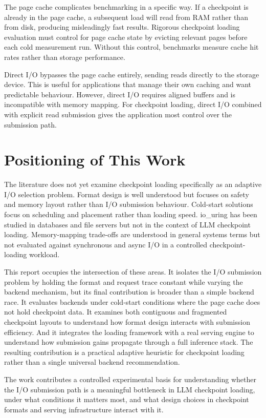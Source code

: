 The page cache complicates benchmarking in a specific way. If a checkpoint is already in the page cache, a subsequent load will read from RAM rather than from disk, producing misleadingly fast results. Rigorous checkpoint loading evaluation must control for page cache state by evicting relevant pages before each cold measurement run. Without this control, benchmarks measure cache hit rates rather than storage performance.

Direct I/O bypasses the page cache entirely, sending reads directly to the storage device. This is useful for applications that manage their own caching and want predictable behaviour. However, direct I/O requires aligned buffers and is incompatible with memory mapping. For checkpoint loading, direct I/O combined with explicit read submission gives the application most control over the submission path.

\section{Positioning of This Work}

The literature does not yet examine checkpoint loading specifically as an adaptive I/O selection problem. Format design is well understood but focuses on safety and memory layout rather than I/O submission behaviour. Cold-start solutions focus on scheduling and placement rather than loading speed. io\_uring has been studied in databases and file servers but not in the context of LLM checkpoint loading. Memory-mapping trade-offs are understood in general systems terms but not evaluated against synchronous and async I/O in a controlled checkpoint-loading workload.

This report occupies the intersection of these areas. It isolates the I/O submission problem by holding the format and request trace constant while varying the backend mechanism, but its final contribution is broader than a simple backend race. It evaluates backends under cold-start conditions where the page cache does not hold checkpoint data. It examines both contiguous and fragmented checkpoint layouts to understand how format design interacts with submission efficiency. And it integrates the loading framework with a real serving engine to understand how submission gains propagate through a full inference stack. The resulting contribution is a practical adaptive heuristic for checkpoint loading rather than a single universal backend recommendation.

The work contributes a controlled experimental basis for understanding whether the I/O submission path is a meaningful bottleneck in LLM checkpoint loading, under what conditions it matters most, and what design choices in checkpoint formats and serving infrastructure interact with it.
